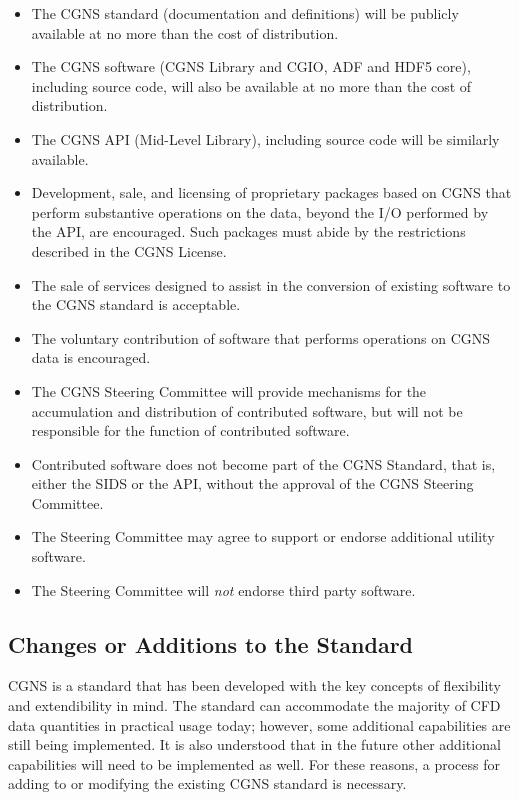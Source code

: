 \begin{itemize}
\item The CGNS standard (documentation and definitions) will be publicly
      available at no more than the cost of distribution.
\item The CGNS software (CGNS Library and CGIO, ADF and HDF5 core), including source
      code, will also be available at no more than the cost of
      distribution.
\item The CGNS API (Mid-Level Library), including source code will be
      similarly available.
\item Development, sale, and licensing of proprietary packages based on
      CGNS that perform substantive operations on the data, beyond the
      I/O performed by the API, are encouraged.
      Such packages must abide by the restrictions described in the
      CGNS License.
\item The sale of services designed to assist in the conversion of
      existing software to the CGNS standard is acceptable.
\item The voluntary contribution of software that performs operations on
      CGNS data is encouraged.
\item The CGNS Steering Committee will provide mechanisms for the
      accumulation and distribution of contributed software, but will not
      be responsible for the function of contributed software.
\item Contributed software does not become part of the CGNS Standard,
      that is, either the SIDS or the API, without the approval of the
      CGNS Steering Committee.
\item The Steering Committee may agree to support or endorse additional
      utility software.
\item The Steering Committee will \emph{not} endorse third party
      software.
\end{itemize}

\subsection{Changes or Additions to the Standard}
\label{s:changes}

CGNS is a standard that has been developed with the key concepts of
flexibility and extendibility in mind.
The standard can accommodate the majority of CFD data quantities in
practical usage today; however, some additional capabilities are still
being implemented.
It is also understood that in the future other additional capabilities
will need to be implemented as well.
For these reasons, a process for adding to or modifying the existing
CGNS standard is necessary.

